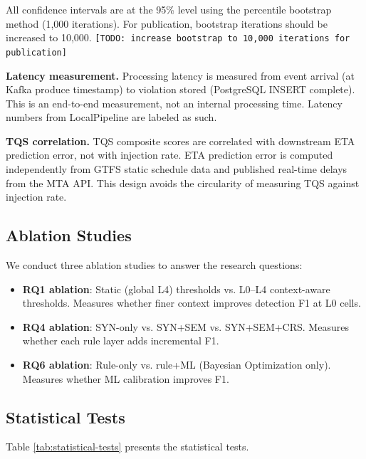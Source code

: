 All confidence intervals are at the 95\% level using the percentile bootstrap
method (1,000 iterations). For publication, bootstrap iterations should be
increased to 10,000.
\texttt{[TODO: increase bootstrap to 10,000 iterations for publication]}

\textbf{Latency measurement.} Processing latency is measured from event arrival
(at Kafka produce timestamp) to violation stored (PostgreSQL INSERT complete).
This is an end-to-end measurement, not an internal processing time.
Latency numbers from LocalPipeline are labeled as such.

\textbf{TQS correlation.} TQS composite scores are correlated with downstream
ETA prediction error, not with injection rate. ETA prediction error is
computed independently from GTFS static schedule data and published real-time
delays from the MTA API. This design avoids the circularity of measuring
TQS against injection rate.

\subsection{Ablation Studies}

We conduct three ablation studies to answer the research questions:

\begin{itemize}
  \itemsep0em
  \item \textbf{RQ1 ablation}: Static (global L4) thresholds vs. L0--L4
        context-aware thresholds. Measures whether finer context improves
        detection F1 at L0 cells.
  \item \textbf{RQ4 ablation}: SYN-only vs. SYN+SEM vs. SYN+SEM+CRS.
        Measures whether each rule layer adds incremental F1.
  \item \textbf{RQ6 ablation}: Rule-only vs. rule+ML (Bayesian Optimization only).
        Measures whether ML calibration improves F1.
\end{itemize}

\subsection{Statistical Tests}

Table \ref{tab:statistical-tests} presents the statistical tests.

